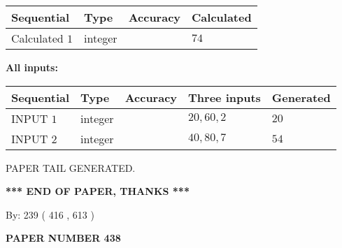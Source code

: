 \documentclass[12pt]{article}
\begin{document}
  
\noindent\begin{tabular}{|l|l|l|l|}
\hline
 Sequential & Type & Accuracy & Calculated \\ 
\hline
 
 
  Calculated $  1 $ & integer &  & 
  $ 74 $ 
 \\  \hline  
 \end{tabular}
   
   
   
   
\noindent\vspace{0.1in}\hspace{-0.08in} {\textbf{\Large{All inputs: }}}
   
   
  
  
\noindent\begin{tabular}{|l|l|l|l|l|}
\hline
 Sequential & Type & Accuracy & Three inputs & Generated \\ 
\hline
 
 
  INPUT $  1 $ & integer &  & $
 20
 , 
 60
 , 
 2
 $ & $ 20 $ 
 \\  \hline  
 
 
  INPUT $  2 $ & integer &  & $
 40
 , 
 80
 , 
 7
 $ & $ 54 $ 
 \\  \hline  
 \end{tabular}
   
   
   
   
   
   
 \vspace{0.2in}
 
   
   
\vspace{2.0in} PAPER TAIL GENERATED.
   
   
   
   
\vspace{1.0in} 
{\textbf{\large{ *** END OF PAPER, THANKS *** }}} 
   
   
\hspace{1.0in} By: 
 239 ( 416 ,  613 )
   
   
   
   
\newpage 
\setcounter{page}{ 
   438001 } 
   
   
   
   
 {\textbf{ \Large{ PAPER NUMBER  438  }}}
   
   
\vspace{0.2in}
   
   
   
\end{document}

